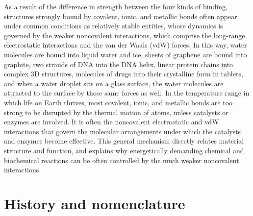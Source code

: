 As a result of the difference in strength between the four kinds of binding, structures strongly bound by covalent, ionic, and metallic bonds often appear under common conditions as relatively stable entities, whose dynamics is governed by the weaker noncovalent interactions, which comprise the long-range electrostatic interactions and the van der Waals (vdW) forces.
In this way, water molecules are bound into liquid water and ice, sheets of graphene are bound into graphite, two strands of DNA into the DNA helix, linear protein chains into complex 3D structures, molecules of drugs into their crystalline form in tablets, and when a water droplet sits on a glass surface, the water molecules are attracted to the surface by those same forces as well.
In the temperature range in which life on Earth thrives, most covalent, ionic, and metallic bonds are too strong to be disrupted by the thermal motion of atoms, unless catalysts or enzymes are involved.
It is often the noncovalent electrostatic and vdW interactions that govern the molecular arrangements under which the catalysts and enzymes become effective.
This general mechanism directly relates material structure and function, and explains why energetically demanding chemical and biochemical reactions can be often controlled by the much weaker noncovalent interactions.

\section{History and nomenclature}

